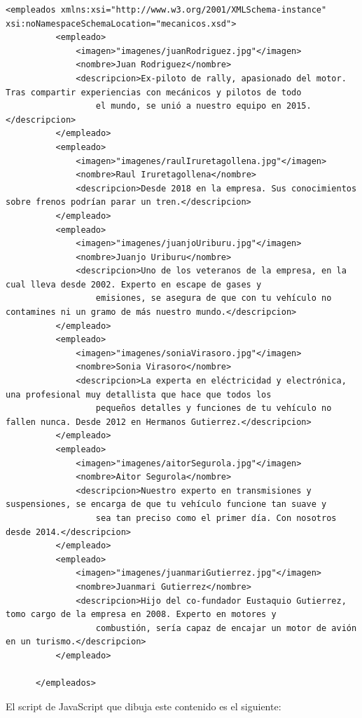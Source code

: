 \documentclass{article}
\begin{document}
{\begin{lstlisting}[caption=mecanicos.xml]
      <empleados xmlns:xsi="http://www.w3.org/2001/XMLSchema-instance" xsi:noNamespaceSchemaLocation="mecanicos.xsd">
          <empleado>
              <imagen>"imagenes/juanRodriguez.jpg"</imagen>
              <nombre>Juan Rodriguez</nombre>
              <descripcion>Ex-piloto de rally, apasionado del motor. Tras compartir experiencias con mecánicos y pilotos de todo
                  el mundo, se unió a nuestro equipo en 2015.</descripcion>
          </empleado>
          <empleado>
              <imagen>"imagenes/raulIruretagollena.jpg"</imagen>
              <nombre>Raul Iruretagollena</nombre>
              <descripcion>Desde 2018 en la empresa. Sus conocimientos sobre frenos podrían parar un tren.</descripcion>
          </empleado>
          <empleado>
              <imagen>"imagenes/juanjoUriburu.jpg"</imagen>
              <nombre>Juanjo Uriburu</nombre>
              <descripcion>Uno de los veteranos de la empresa, en la cual lleva desde 2002. Experto en escape de gases y
                  emisiones, se asegura de que con tu vehículo no contamines ni un gramo de más nuestro mundo.</descripcion>
          </empleado>
          <empleado>
              <imagen>"imagenes/soniaVirasoro.jpg"</imagen>
              <nombre>Sonia Virasoro</nombre>
              <descripcion>La experta en eléctricidad y electrónica, una profesional muy detallista que hace que todos los
                  pequeños detalles y funciones de tu vehículo no fallen nunca. Desde 2012 en Hermanos Gutierrez.</descripcion>
          </empleado>
          <empleado>
              <imagen>"imagenes/aitorSegurola.jpg"</imagen>
              <nombre>Aitor Segurola</nombre>
              <descripcion>Nuestro experto en transmisiones y suspensiones, se encarga de que tu vehículo funcione tan suave y
                  sea tan preciso como el primer día. Con nosotros desde 2014.</descripcion>
          </empleado>
          <empleado>
              <imagen>"imagenes/juanmariGutierrez.jpg"</imagen>
              <nombre>Juanmari Gutierrez</nombre>
              <descripcion>Hijo del co-fundador Eustaquio Gutierrez, tomo cargo de la empresa en 2008. Experto en motores y
                  combustión, sería capaz de encajar un motor de avión en un turismo.</descripcion>
          </empleado>
          
      </empleados>
      \end{lstlisting}
}
\clearpage
El script de JavaScript que dibuja este contenido es el siguiente:
\end{document}
